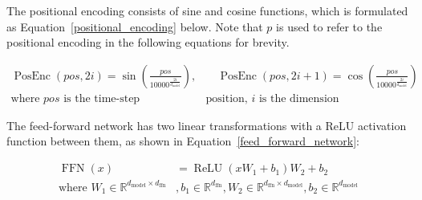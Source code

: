 \documentclass{article}
\begin{document}
The positional encoding consists of sine and cosine functions, which is formulated as Equation~\ref{positional_encoding} below. Note that $p$ is used to refer to the positional encoding in the following equations for brevity.

\begin{equation} \label{positional_encoding}
	\begin{aligned}
		\operatorname{PosEnc}(pos, 2i)   = \sin \left(\frac{pos}{10000^{\frac{2i}{d_{\text{model}}}}}\right),&\hspace{1em}
		\operatorname{PosEnc}(pos, 2i+1) = \cos \left(\frac{pos}{10000^{\frac{2i}{d_{\text{model}}}}}\right) \\
		\text{where } pos \text{ is the time-step } &\text{position, } i \text{ is the dimension}
	\end{aligned}
\end{equation}

The feed-forward network has two linear transformations with a ReLU activation function between them, as shown in Equation~\ref{feed_forward_network}:

\begin{equation} \label{feed_forward_network}
	\begin{aligned}
		\operatorname{FFN}\left(x\right) &= \operatorname{ReLU}\left(x W_1 + b_1\right) W_2 + b_2 \\
		\text{where } W_1 \in \mathbb{R}^{d_\text{model} \times d_\text{ffn}}&, b_1 \in \mathbb{R}^{d_\text{ffn}}, W_2 \in \mathbb{R}^{d_\text{ffn} \times d_\text{model}}, b_2 \in \mathbb{R}^{d_\text{model}}
	\end{aligned}
\end{equation}
\end{document}
